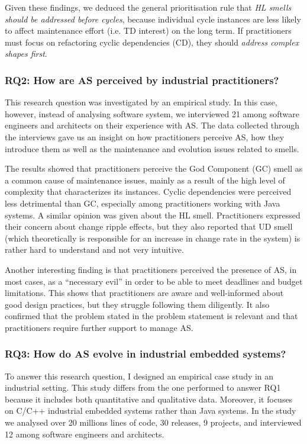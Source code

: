 Given these findings, we deduced the general prioritisation rule that \emph{HL smells should be addressed before cycles}, because individual cycle instances are less likely to affect maintenance effort (i.e. TD interest) on the long term.
If practitioners must focus on refactoring cyclic dependencies (CD), they should \emph{address complex shapes first}.

\subsubsection*{RQ2: How are AS perceived by industrial practitioners?}
This research question was investigated by an empirical study.
In this case, however, instead of analysing software system, we interviewed 21 among software engineers and architects on their experience with AS.
The data collected through the interviews gave us an insight on how practitioners perceive AS, how they introduce them as well as the maintenance and evolution issues related to smells. 

The results showed that practitioners perceive the God Component (GC) smell as a common cause of maintenance issues, mainly as a result of the high level of complexity that characterizes its instances. 
Cyclic dependencies were perceived less detrimental than GC, especially among practitioners working with Java systems. A similar opinion was given about the HL smell.
Practitioners expressed their concern about change ripple effects, but they also reported that UD smell (which theoretically is responsible for an increase in change rate in the system) is rather hard to understand and not very intuitive. 

Another interesting finding is that practitioners perceived the presence of AS, in most cases, as a ``necessary evil'' in order to be able to meet deadlines and budget limitations.
This shows that practitioners are aware and well-informed about good design practices, but they struggle following them diligently.
It also confirmed that the problem stated in the problem statement is relevant and that practitioners require further support to manage AS.

\subsubsection*{RQ3: How do AS evolve in industrial embedded systems?}
To answer this research question, I designed an empirical case study in an industrial setting.
This study differs from the one performed to answer RQ1 because it includes both quantitative and qualitative data. Moreover, it focuses on C/C++ industrial embedded systems rather than Java systems.
In the study we analysed over 20 millions lines of code, 30 releases, 9 projects, and interviewed 12 among software engineers and architects.

